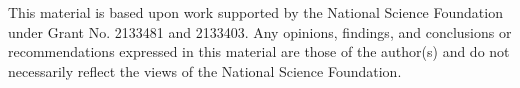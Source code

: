 This material is based upon work supported by the National Science Foundation under Grant No. 2133481 and 2133403. Any opinions, findings, and conclusions or recommendations expressed in this material are those of the author(s) and do not necessarily reflect the views of the National Science Foundation.